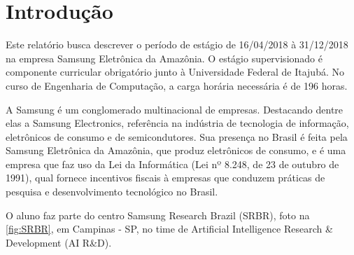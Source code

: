 \documentclass[
	12pt,				%
    oneside,			%
	a4paper,			%
	english,			%
	french,				%
	spanish,			%
	brazil				%
	]{abntex2}
\begin{document}

\frenchspacing

\imprimircapa
\imprimirfolhaderosto*

\tableofcontents*
\clearpage

\textual

\chapter{Introdução}

Este relatório busca descrever o período de estágio de 16/04/2018 à 31/12/2018 na empresa Samsung Eletrônica da Amazônia. O estágio supervisionado é componente curricular obrigatório junto à Universidade Federal de Itajubá. No curso de Engenharia de Computação, a carga horária necessária é de 196 horas.

A Samsung é um conglomerado multinacional de empresas. Destacando dentre elas a Samsung Electronics, referência na indústria de tecnologia de informação, eletrônicos de consumo e de semicondutores. Sua presença no Brasil é feita pela Samsung Eletrônica da Amazônia, que produz eletrônicos de consumo, e é uma empresa que faz uso da Lei da Informática (Lei nº 8.248, de 23 de outubro de 1991), qual fornece incentivos fiscais à empresas que conduzem práticas de pesquisa e desenvolvimento tecnológico no Brasil.

O aluno faz parte do centro Samsung Research Brazil (SRBR), foto na \autoref{fig:SRBR}, em Campinas - SP, no time de Artificial Intelligence Research \& Development (AI R\&D).
\end{document}
